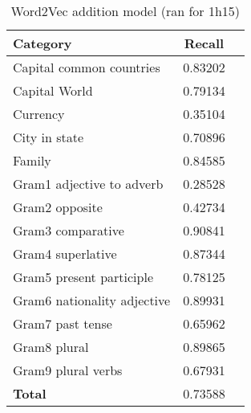 \label{sec:tabellen}
\begin{center}
    \begin{table}[h!]
        \begin{tabular}{| l | c | r}
        	\hline
        	\textbf{Category} &    \textbf{Recall}\\ \hline
        	Capital common countries 	& 0.83202 \\
        	Capital World 				& 0.79134 \\
        	Currency					& 0.35104 \\
        	City in state				& 0.70896 \\
        	Family 						& 0.84585 \\
        	Gram1 adjective to adverb 	& 0.28528 \\
        	Gram2 opposite 				& 0.42734 \\
        	Gram3 comparative 			& 0.90841 \\
        	Gram4 superlative 			& 0.87344 \\
        	Gram5 present participle	& 0.78125 \\
        	Gram6 nationality adjective & 0.89931 \\
        	Gram7 past tense 			& 0.65962 \\
        	Gram8 plural 				& 0.89865 \\
        	Gram9 plural verbs 			& 0.67931 \\
        	\textbf{Total}				& 0.73588 \\ \hline
        \end{tabular}
    \caption{Word2Vec addition model (ran for 1h15)}
    \label{table:word2vec_addition}
    \end{table}
    

\end{center}
